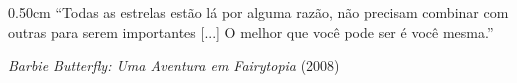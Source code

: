 \begin{epigrafe}
  \vspace*{\fill}
  \begin{adjustwidth}{0.5\textwidth}{0cm}
    \SingleSpacing\raggedleft
    ``Todas as estrelas estão lá por alguma razão, não precisam combinar com outras para serem importantes [...] O melhor que você pode ser é você mesma.''\par
    \medskip
    \textit{Barbie Butterfly: Uma Aventura em Fairytopia} (2008)
  \end{adjustwidth}
\end{epigrafe}
